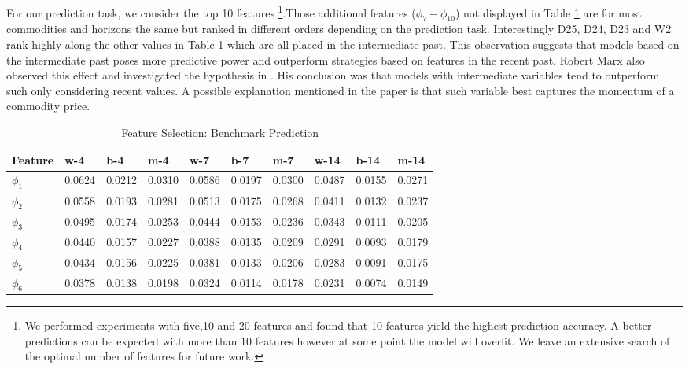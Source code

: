 For our prediction task, we consider the top 10 features \footnote{We performed experiments with five,10 and 20 features and found that 10 features yield the highest prediction accuracy. A better predictions can be expected with more than 10 features however at some point the model will overfit. We leave an extensive search of the optimal number of features for future work.}.Those additional features ($\phi_7 - \phi_10$) not displayed in Table \ref{tab:feat_mod1}  are for most commodities and horizons the same but ranked in different orders depending on the prediction task. Interestingly D25, D24, D23 and W2 rank highly along the other values in Table \ref{tab:feat_mod1} which are all placed in the intermediate past. This observation suggests that models based on the intermediate past poses more predictive power and outperform strategies based on features in the recent past. Robert Marx also observed this effect and investigated the hypothesis in \cite{iuj11}. His conclusion was that models with intermediate variables tend to outperform such only considering recent values. A possible explanation mentioned in the paper is that such variable best captures the momentum of a commodity price. 




\begin{table}[H]
\centering
\begin{tabular}{ |p{2cm}|p{1cm}|p{1cm}|p{1cm}|p{1cm}|p{1cm}|p{1cm}|p{1cm}|p{1cm}|p{1cm}| }
  \hline
 Feature & w-4 & b-4 & m-4 & w-7 & b-7 & m-7 & w-14 & b-14 & m-14   \\
 \hline

 $\phi_1$ & 0.0624   & 0.0212   & 0.0310 &  0.0586  & 0.0197 & 0.0300 & 0.0487 & 0.0155 & 0.0271\\
  \hline
  $\phi_2$ & 0.0558 & 0.0193 & 0.0281 & 0.0513 & 0.0175 & 0.0268 & 0.0411 & 0.0132 & 0.0237 \\
  \hline
  $\phi_3$ & 0.0495 & 0.0174 & 0.0253 & 0.0444 & 0.0153 & 0.0236 & 0.0343 & 0.0111 & 0.0205 \\
  \hline 
  $\phi_4$ & 0.0440 & 0.0157 & 0.0227 & 0.0388 & 0.0135 & 0.0209 & 0.0291 & 0.0093 & 0.0179 \\
  \hline 
  $\phi_5$ & 0.0434 & 0.0156 & 0.0225 & 0.0381 & 0.0133 & 0.0206 & 0.0283 & 0.0091 & 0.0175 \\
  \hline
  $\phi_6$ & 0.0378 & 0.0138 & 0.0198 & 0.0324 & 0.0114 & 0.0178 & 0.0231 & 0.0074 & 0.0149 \\
  \hline
 \end{tabular}
\caption{Feature Selection: Benchmark Prediction}
\label{tab:feat_mod1}
\end{table}


